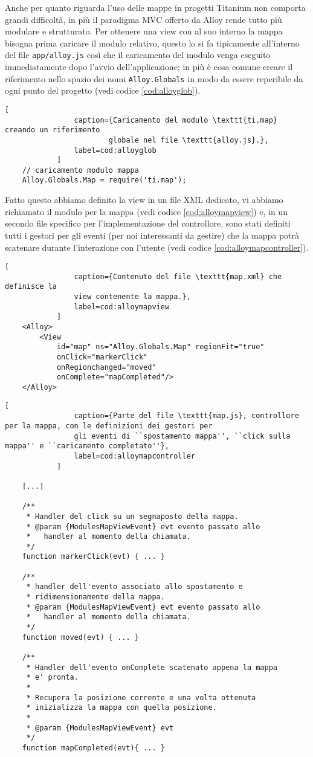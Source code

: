 			Anche per quanto riguarda l'uso delle mappe in progetti Titanium
			non comporta grandi difficoltà, in più il paradigma MVC
			offerto da Alloy rende tutto più modulare e strutturato. Per ottenere
			una view con al suo interno la mappa bisogna prima caricare il modulo
			relativo, questo lo si fa tipicamente all'interno del file
			\texttt{app/alloy.js} così che il caricamento del modulo venga
			eseguito immediatamente dopo l'avvio dell'applicazione; in più è cosa
			comune creare il riferimento nello spazio dei nomi \texttt{Alloy.Globals}
			in modo da essere reperibile da ogni punto del progetto (vedi codice \ref{cod:alloyglob}).
			\begin{lstlisting}[
				caption={Caricamento del modulo \texttt{ti.map} creando un riferimento
				        globale nel file \texttt{alloy.js}.},
				label=cod:alloyglob
			]
	// caricamento modulo mappa
	Alloy.Globals.Map = require('ti.map');
			\end{lstlisting}
			Fatto questo abbiamo definito la view in un file XML dedicato, vi abbiamo richiamato
			il modulo per la mappa (vedi codice \ref{cod:alloymapview}) e, in un secondo file \js{} specifico per
			l'implementazione del controllore, sono stati definiti tutti i
			gestori per gli eventi (per noi interessanti da gestire) che la
			mappa potrà scatenare durante l'interazione con l'utente (vedi codice \ref{cod:alloymapcontroller}).
			\begin{lstlisting}[
				caption={Contenuto del file \texttt{map.xml} che definisce la
				view contenente la mappa.},
				label=cod:alloymapview
			]
	<Alloy>
		<View
			id="map" ns="Alloy.Globals.Map" regionFit="true"
			onClick="markerClick"
			onRegionchanged="moved"
			onComplete="mapCompleted"/>
	</Alloy>
			\end{lstlisting}
			\begin{lstlisting}[
				caption={Parte del file \texttt{map.js}, controllore per la mappa, con le definizioni dei gestori per
				gli eventi di ``spostamento mappa'', ``click sulla mappa'' e ``caricamento completato''},
				label=cod:alloymapcontroller
			]

	[...]

	/**
	 * Handler del click su un segnaposto della mappa.
	 * @param {ModulesMapViewEvent} evt evento passato allo
	 *   handler al momento della chiamata.
	 */
	function markerClick(evt) {	...	}

	/**
	 * handler dell'evento associato allo spostamento e
	 * ridimensionamento della mappa.
	 * @param {ModulesMapViewEvent} evt evento passato allo
	 *   handler al momento della chiamata.
	 */
	function moved(evt) { ... }

	/**
	 * Handler dell'evento onComplete scatenato appena la mappa
	 * e' pronta.
	 *
	 * Recupera la posizione corrente e una volta ottenuta
	 * inizializza la mappa con quella posizione.
	 *
	 * @param {ModulesMapViewEvent} evt
	 */
	function mapCompleted(evt){ ... }

			\end{lstlisting}
